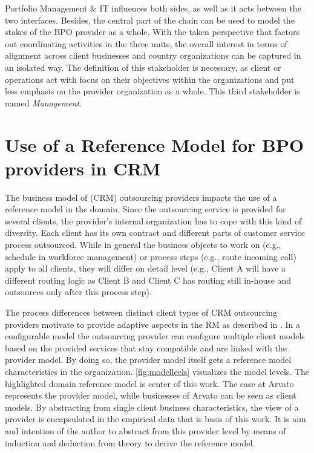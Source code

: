   Portfolio Management \& IT influences both sides, as well as it acts between the two interfaces. Besides, the central part of the chain can be used to model the stakes of the BPO provider as a whole. With the taken perspective that factors out coordinating activities in the three units, the overall interest in terms of alignment across client businesses and country organizations can be captured in an isolated way. The definition of this stakeholder is necessary, as client or operations act with focus on their objectives within the organizations and put less emphasis on the provider organization as a whole. This third stakeholder is named \textit{Management}. 
  

\section{Use of a Reference Model for BPO providers in CRM}

The business model of (CRM) outsourcing providers impacts the use of a reference model in the domain. Since the outsourcing service is provided for several clients, the provider’s internal organization has to cope with this kind of diversity. Each client has its own contract and different parts of customer service process outsourced. While in general the business objects to work on (e.g., schedule in workforce management) or process steps (e.g., route incoming call) apply to all clients, they will differ on detail level (e.g., Client A will have a different routing logic as Client B and Client C has routing still in-house and outsources only after this process step).

The process differences between distinct client types of CRM outsourcing providers motivate to provide adaptive aspects in the \acrshort{RM} as described in \cite{delfmann2006adaptive}. In a configurable model the outsourcing provider can configure multiple client models based on the provided services that stay compatible and are linked with the provider model. By doing so, the provider model itself gets a reference model characteristics in the organization. \Fig \ref{fig:modelleels} visualizes the model levels. The highlighted domain reference model is center of this work. The case at Arvato represents the provider model, while businesses of Arvato can be seen as client models. By abstracting from single client business characteristics, the view of a provider is encapsulated in the empirical data that is basis of this work. It is aim and intention of the author to abstract from this provider level by means of induction and deduction from theory to derive the reference model.    

